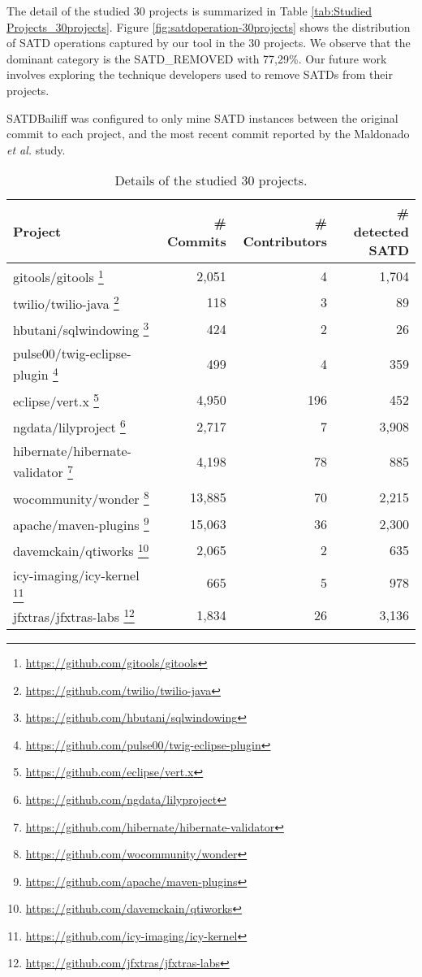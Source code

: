 \documentclass[3p]{elsarticle}
\newcommand{\approach}{SATDBailiff\xspace}
\begin{document}
The detail of the studied 30 projects is summarized in Table \ref{tab:Studied Projects_30projects}. Figure \ref{fig:satdoperation-30projects} shows the distribution of SATD operations captured by our tool in the 30 projects. We observe that the dominant category is the SATD\_REMOVED with 77,29\%. Our future work involves exploring the technique developers used to remove SATDs from their projects.

\approach was configured to only mine SATD instances between the original commit to each project, and the most recent commit reported by the Maldonado \textit{et al.} study. 


\begin{table}[h]
    \centering
    \caption{Details of the studied 30 projects.}
    \begin{tabular}{|l|r|r|r|}
     \hline
     \textbf{Project} &  \textbf{\# Commits} &  \textbf{\# Contributors} & \textbf{\# detected SATD} \\
     \hline 
gitools/gitools \footnote{\url{	https://github.com/gitools/gitools}} &  2,051 & 4 &  1,704  \\
twilio/twilio-java	 \footnote{\url{https://github.com/twilio/twilio-java}} & 118 & 3 &  89  \\
hbutani/sqlwindowing	 \footnote{\url{https://github.com/hbutani/sqlwindowing}} & 424 & 2&  26  \\
pulse00/twig-eclipse-plugin	 \footnote{\url{https://github.com/pulse00/twig-eclipse-plugin}}&  499 & 4 & 359 \\
eclipse/vert.x	 \footnote{\url{https://github.com/eclipse/vert.x}} & 4,950 & 196 & 452  \\
ngdata/lilyproject	 \footnote{\url{https://github.com/ngdata/lilyproject}} & 2,717 & 7 & 3,908\\
hibernate/hibernate-validator	 \footnote{\url{https://github.com/hibernate/hibernate-validator}} & 4,198 & 78 & 885 \\
wocommunity/wonder	 \footnote{\url{https://github.com/wocommunity/wonder}} & 13,885 & 70 & 2,215 \\
apache/maven-plugins	 \footnote{\url{https://github.com/apache/maven-plugins}} & 15,063 & 36 & 2,300 \\
davemckain/qtiworks	 \footnote{\url{https://github.com/davemckain/qtiworks}} & 2,065 & 2 &  635 \\
icy-imaging/icy-kernel	 \footnote{\url{https://github.com/icy-imaging/icy-kernel}} & 665 & 5 & 978  \\
jfxtras/jfxtras-labs	 \footnote{\url{https://github.com/jfxtras/jfxtras-labs}} & 1,834 & 26 & 3,136   \\

\end{tabular}
\end{table}
\end{document}
